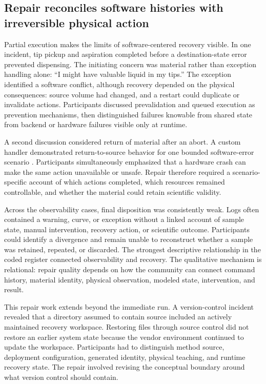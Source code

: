 \subsection{Repair reconciles software histories with irreversible physical action}

Partial execution makes the limits of software-centered recovery visible. In one incident, tip pickup and aspiration completed before a destination-state error prevented dispensing. The initiating concern was material rather than exception handling alone: ``I might have valuable liquid in my tips.'' \cite{forum_error_catching} The exception identified a software conflict, although recovery depended on the physical consequences: source volume had changed, and a restart could duplicate or invalidate actions. Participants discussed prevalidation and queued execution as prevention mechanisms, then distinguished failures knowable from shared state from backend or hardware failures visible only at runtime.

A second discussion considered return of material after an abort. A custom handler demonstrated return-to-source behavior for one bounded software-error scenario \cite{forum_return_volume}. Participants simultaneously emphasized that a hardware crash can make the same action unavailable or unsafe. Repair therefore required a scenario-specific account of which actions completed, which resources remained controllable, and whether the material could retain scientific validity.

Across the observability cases, final disposition was consistently weak. Logs often contained a warning, curve, or exception without a linked account of sample state, manual intervention, recovery action, or scientific outcome. Participants could identify a divergence and remain unable to reconstruct whether a sample was retained, repeated, or discarded. The strongest descriptive relationship in the coded register connected observability and recovery. The qualitative mechanism is relational: repair quality depends on how the community can connect command history, material identity, physical observation, modeled state, intervention, and result.

This repair work extends beyond the immediate run. A version-control incident revealed that a directory assumed to contain source included an actively maintained recovery workspace. Restoring files through source control did not restore an earlier system state because the vendor environment continued to update the workspace. Participants had to distinguish method source, deployment configuration, generated identity, physical teaching, and runtime recovery state. The repair involved revising the conceptual boundary around what version control should contain.

